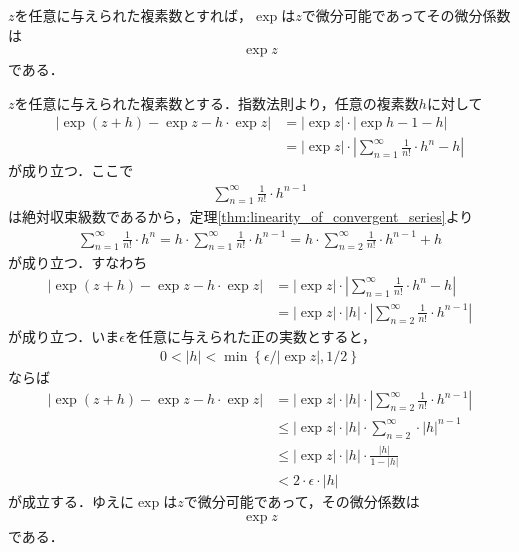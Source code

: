 	\begin{screen}
		\begin{thm}[指数関数は各点で微分可能]
			$z$を任意に与えられた複素数とすれば，$\exp$は$z$で微分可能であってその微分係数は
			\begin{align}
				\exp{z}
			\end{align}
			である．
		\end{thm}
	\end{screen}
	
	\begin{sketch}
		$z$を任意に与えられた複素数とする．指数法則より，任意の複素数$h$に対して
		\begin{align}
			|\exp{(z+h)} - \exp{z} - h \cdot \exp{z}|
			&= |\exp{z}| \cdot |\exp{h} - 1 - h| \\
			&= |\exp{z}| \cdot \left|\sum_{n=1}^\infty \frac{1}{n!} \cdot h^n - h\right|
		\end{align}
		が成り立つ．ここで
		\begin{align}
			\sum_{n=1}^\infty \frac{1}{n!} \cdot h^{n-1}
		\end{align}
		は絶対収束級数であるから，定理\ref{thm:linearity_of_convergent_series}より
		\begin{align}
			\sum_{n=1}^\infty \frac{1}{n!} \cdot h^{n}
			= h \cdot \sum_{n=1}^\infty \frac{1}{n!} \cdot h^{n-1}
			= h \cdot \sum_{n=2}^\infty \frac{1}{n!} \cdot h^{n-1} + h
		\end{align}
		が成り立つ．すなわち
		\begin{align}
			|\exp{(z+h)} - \exp{z} - h \cdot \exp{z}|
			&= |\exp{z}| \cdot \left|\sum_{n=1}^\infty \frac{1}{n!} \cdot h^n - h\right| \\
			&= |\exp{z}| \cdot |h| \cdot \left|\sum_{n=2}^\infty \frac{1}{n!} \cdot h^{n-1}\right|
		\end{align}
		が成り立つ．いま$\epsilon$を任意に与えられた正の実数とすると，
		\begin{align}
			0 < |h| < \min\left\{\epsilon/|\exp{z}|,1/2\right\}
		\end{align}
		ならば
		\begin{align}
			|\exp{(z+h)} - \exp{z} - h \cdot \exp{z}|
			&= |\exp{z}| \cdot |h| \cdot \left|\sum_{n=2}^\infty \frac{1}{n!} \cdot h^{n-1}\right| \\
			&\leq |\exp{z}| \cdot |h| \cdot \sum_{n=2}^\infty \cdot |h|^{n-1} \\
			&\leq |\exp{z}| \cdot |h| \cdot \frac{|h|}{1-|h|} \\
			&< 2 \cdot \epsilon \cdot |h|
		\end{align}
		が成立する．ゆえに$\exp$は$z$で微分可能であって，その微分係数は
		\begin{align}
			\exp{z}
		\end{align}
		である．
		\QED
	\end{sketch}
	
